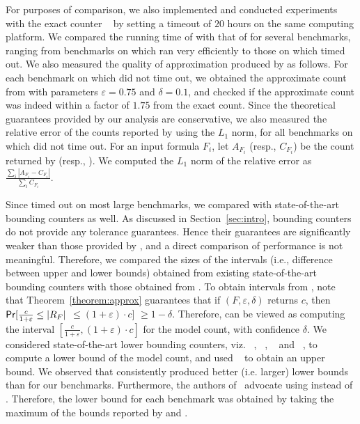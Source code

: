 For purposes of comparison, we also implemented and conducted
experiments with the exact counter
{\Cachet}~\cite{Sang04combiningcomponent} by setting a timeout of $20$
hours on the same computing platform.  We compared the running time of
{\ApproxMC} with that of {\Cachet} for several benchmarks, ranging
from benchmarks on which {\Cachet} ran very efficiently to those on
which {\Cachet} timed out.  We also measured the quality of
approximation produced by {\ApproxMC} as follows.  For each benchmark
on which {\Cachet} did not time out, we obtained the approximate count
from {\ApproxMC} with parameters $\varepsilon = 0.75$ and $\delta =
0.1$, and checked if the approximate count was indeed within a factor
of $1.75$ from the exact count.  Since the theoretical guarantees
provided by our analysis are conservative, we also measured the
relative error of the counts reported by {\ApproxCount} using the
$L_1$ norm, for all benchmarks on which {\Cachet} did not time out.
For an input formula $F_i$, let $A_{F_i}$ (resp., $C_{F_i}$) be the
count returned by {\ApproxCount} (resp., {\Cachet}).  We computed the
$L_1$ norm of the relative error as $\frac{\sum_i |A_{F_i} -
  C_{F_i}|}{\sum_i C_{F_{i}}}$.
     
Since {\Cachet} timed out on most large benchmarks, we compared
{\ApproxMC} with state-of-the-art bounding counters as well.  As
discussed in Section~\ref{sec:intro}, bounding counters do not provide
any tolerance guarantees.  Hence their guarantees are significantly
weaker than those provided by {\approxMC}, and a direct comparison of
performance is not meaningful.  Therefore, we compared the sizes of
the intervals (i.e., difference between upper and lower bounds)
obtained from existing state-of-the-art bounding counters with those
obtained from {\approxMC}.  To obtain intervals from {\ApproxMC}, note
that Theorem~\ref{theorem:approx} guarantees that if {\ApproxMC}$(F,
\varepsilon, \delta)$ returns $c$, then $\mathsf{Pr}[\frac{c}{1+\varepsilon}
  \le |R_F| $ $\le (1+\varepsilon)\cdot c]$ $\ge 1-\delta$.
Therefore, {\ApproxMC} can be viewed as computing the interval
$[\frac{c}{1+\varepsilon}, (1+\varepsilon)\cdot c]$ for the model count,
with confidence $\delta$.  We considered state-of-the-art lower
bounding counters, viz.  {\MBound}~\cite{gomes2006model},
{\HybridMBound}~\cite{gomes2006model},
{\SampleCount}~\cite{gomes2007sampling} and
{\BPCount}~\cite{KrocSabSel2008}, to compute a lower bound of the
model count, and used {\MiniCount}~\cite{KrocSabSel2008} to obtain an
upper bound.  We observed that {\SampleCount} consistently produced
better (i.e. larger) lower bounds than {\BPCount} for our benchmarks.
Furthermore, the authors of~\cite{gomes2006model} advocate using
{\HybridMBound} instead of {\MBound}.  Therefore, the lower bound for
each benchmark was obtained by taking the maximum of the bounds
reported by {\HybridMBound} and {\SampleCount}.

